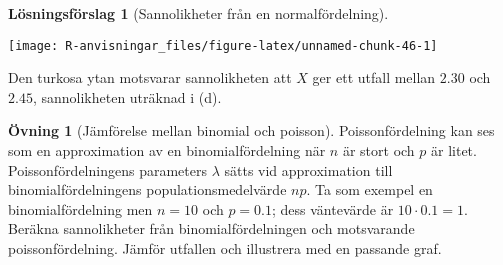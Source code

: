 \documentclass[
]{book}
\theoremstyle{definition}
\theoremstyle{definition}
\theoremstyle{definition}
\newtheorem{exercise}{Övning}[chapter]
\theoremstyle{definition}
\newtheorem{hypothesis}{Lösningsförslag}[chapter]
\theoremstyle{remark}
\begin{document}
\begin{hypothesis}[Sannolikheter från en normalfördelning]
\begin{center}\texttt{[image: R-anvisningar\_files/figure-latex/unnamed-chunk-46-1]} \end{center}

Den turkosa ytan motsvarar sannolikheten att \(X\) ger ett utfall mellan \(2.30\) och \(2.45\), sannolikheten uträknad i (d).
\end{hypothesis}

\begin{exercise}[Jämförelse mellan binomial och poisson]
Poissonfördelning kan ses som en approximation av en binomialfördelning när \(n\) är stort och \(p\) är litet. Poissonfördelningens parameters \(\lambda\) sätts vid approximation till binomialfördelningens populationsmedelvärde \(np\).
Ta som exempel en binomialfördelning men \(n = 10\) och \(p = 0.1\); dess väntevärde är \(10 \cdot 0.1 = 1\).
Beräkna sannolikheter från binomialfördelningen och motsvarande poissonfördelning. Jämför utfallen och illustrera med en passande graf.
\end{exercise}
\end{document}
